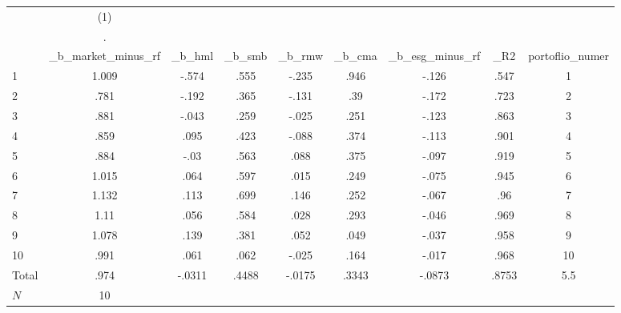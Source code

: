 {
\def\sym#1{\ifmmode^{#1}\else\(^{#1}\)\fi}
\begin{tabular}{l*{1}{cccccccc}}
\hline\hline
            &\multicolumn{1}{c}{(1)}&            &            &            &            &            &            &            \\
            &           .&            &            &            &            &            &            &            \\
            &\_b\_market\_minus\_rf&      \_b\_hml&      \_b\_smb&      \_b\_rmw&      \_b\_cma&\_b\_esg\_minus\_rf&         \_R2&portoflio\_numer\\
\hline
1           &       1.009&       -.574&        .555&       -.235&        .946&       -.126&        .547&           1\\
2           &        .781&       -.192&        .365&       -.131&         .39&       -.172&        .723&           2\\
3           &        .881&       -.043&        .259&       -.025&        .251&       -.123&        .863&           3\\
4           &        .859&        .095&        .423&       -.088&        .374&       -.113&        .901&           4\\
5           &        .884&        -.03&        .563&        .088&        .375&       -.097&        .919&           5\\
6           &       1.015&        .064&        .597&        .015&        .249&       -.075&        .945&           6\\
7           &       1.132&        .113&        .699&        .146&        .252&       -.067&         .96&           7\\
8           &        1.11&        .056&        .584&        .028&        .293&       -.046&        .969&           8\\
9           &       1.078&        .139&        .381&        .052&        .049&       -.037&        .958&           9\\
10          &        .991&        .061&        .062&       -.025&        .164&       -.017&        .968&          10\\
Total       &        .974&      -.0311&       .4488&      -.0175&       .3343&      -.0873&       .8753&         5.5\\
\hline
\(N\)       &          10&            &            &            &            &            &            &            \\
\hline\hline
\end{tabular}
}
